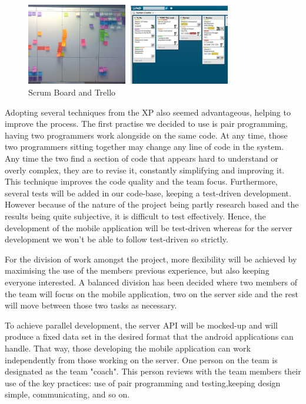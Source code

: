 \begin{figure}[here]
\begin{minipage}{\textwidth}
\begin{center}
\includegraphics[width=0.8\textwidth]{images/scrumboard.jpg}
\end{center}
\vspace{-20pt}
\caption[Caption for LOF]{Scrum Board and Trello\footnotemark}
\end{minipage} 
\end{figure}

Adopting several techniques from the XP also seemed advantageous, helping to
improve the process. The first practise we decided to use is pair programming,
having two programmers work alongside on the same code. At any time, those two
programmers sitting together may change any line of code in the system. Any
time the two find a section of code that appears hard to understand or overly
complex, they are to revise it, constantly simplifying and improving it. This
technique improves the code quality and the team focus. Furthermore, several
tests will be added in our code-base, keeping a test-driven development.
However because of the nature of the project being partly research based and
the results being quite subjective, it is difficult to test effectively. Hence,
the development of the mobile application will be test-driven whereas for the
server development we won't be able to follow test-driven so strictly.\cite{Cockburn}

For the division of work amongst the project, more flexibility will be achieved by maximising the use of the members previous experience, but also keeping everyone interested. A balanced division has been decided where two members of the team will focus on the mobile application, two on the server side and the rest will move between those two tasks as necessary.

To achieve parallel development, the server API will be mocked-up and will produce a fixed data set in the desired format that the android applications can handle. That way, those developing the mobile application can work independently from those working on the server. One person on the team is designated as the team "coach". This person reviews with the team members their use of the key practices: use of pair programming and testing,keeping design simple, communicating, and so on.

